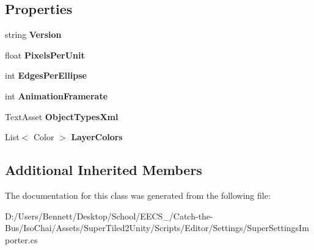 \subsection*{Properties}
\begin{DoxyCompactItemize}
\item 
\mbox{\label{class_super_tiled2_unity_1_1_editor_1_1_super_settings_importer_a96732d6afb0f9cbcc5c9370a33acf22c}} 
string {\bfseries Version}
\item 
\mbox{\label{class_super_tiled2_unity_1_1_editor_1_1_super_settings_importer_ae51baf427731c1b6cc9c1252349ca9f2}} 
float {\bfseries Pixels\+Per\+Unit}
\item 
\mbox{\label{class_super_tiled2_unity_1_1_editor_1_1_super_settings_importer_ae212a67bd6c9e7c2fcaa9a6bb4755721}} 
int {\bfseries Edges\+Per\+Ellipse}
\item 
\mbox{\label{class_super_tiled2_unity_1_1_editor_1_1_super_settings_importer_ac845228cd844080e0c879a3bd82b9f96}} 
int {\bfseries Animation\+Framerate}
\item 
\mbox{\label{class_super_tiled2_unity_1_1_editor_1_1_super_settings_importer_a914cc6691b4d2c01ee5a3f898f073c1c}} 
Text\+Asset {\bfseries Object\+Types\+Xml}
\item 
\mbox{\label{class_super_tiled2_unity_1_1_editor_1_1_super_settings_importer_ad6a5113cfde265b657ce4bb0e6743348}} 
List$<$ Color $>$ {\bfseries Layer\+Colors}
\end{DoxyCompactItemize}
\subsection*{Additional Inherited Members}


The documentation for this class was generated from the following file\+:\begin{DoxyCompactItemize}
\item 
D\+:/\+Users/\+Bennett/\+Desktop/\+School/\+E\+E\+C\+S\+\_/\+Catch-\/the-\/\+Bus/\+Iso\+Chai/\+Assets/\+Super\+Tiled2\+Unity/\+Scripts/\+Editor/\+Settings/Super\+Settings\+Importer.\+cs\end{DoxyCompactItemize}
